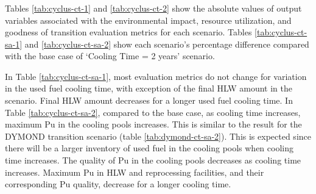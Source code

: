 \begin{table}[H]
        \end{table}

    
\subsubsection{\textbf{\Cyclus}}

Tables \ref{tab:cyclus-ct-1} and \ref{tab:cyclus-ct-2} show 
the absolute values of 
output variables associated with the environmental impact, 
resource utilization, and goodness of transition evaluation 
metrics for each scenario. 
Tables \ref{tab:cyclus-ct-sa-1} and \ref{tab:cyclus-ct-sa-2} 
show each scenario's percentage 
difference compared with the base case of `Cooling Time = 2 years'
scenario.

In Table \ref{tab:cyclus-ct-sa-1}, most evaluation metrics do not change 
for variation in the used fuel cooling time, with exception of the final 
HLW amount in the scenario. 
Final HLW amount decreases for a longer used fuel cooling time.
In Table \ref{tab:cyclus-ct-sa-2}, compared to the base case, 
as cooling time increases, maximum Pu in the cooling pools increases.
This is similar to the result for the DYMOND transition scenario (table 
\ref{tab:dymond-ct-sa-2}). 
This is expected since there will be a larger inventory of used fuel 
in the cooling pools when cooling time increases. 
The quality of Pu in the cooling pools decreases as cooling time 
increases. 
Maximum Pu in HLW and reprocessing facilities, and their corresponding 
Pu quality, decrease for a longer cooling time. 

